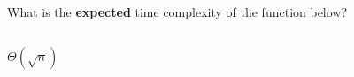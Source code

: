 \begin{prob}
    What is the \textbf{expected} time complexity of the function below?

    \inputminted{python}{./code.py}

    \begin{soln}
        $\Theta(\sqrt n)$
    \end{soln}

\end{prob}

